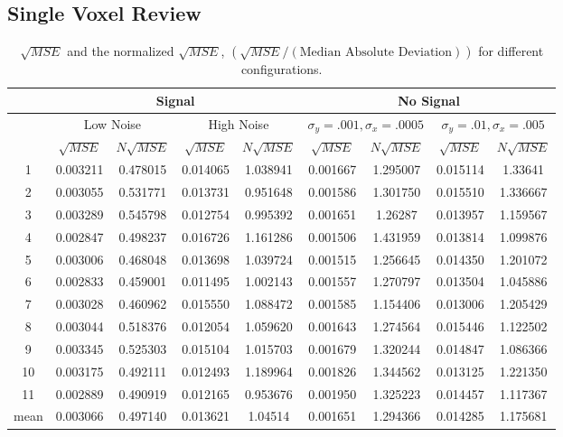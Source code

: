\subsection{Single Voxel Review}
\begin{table}[t]
\centering
\begin{tabular}{|c | c | c | c | c | c | c | c | c |}
\hline 
& \multicolumn{4}{|c|}{Signal} & \multicolumn{4}{|c|}{No Signal}\\
\hline
& \multicolumn{2}{|c|}{Low Noise} & \multicolumn{2}{|c|}{High Noise} 
& \multicolumn{2}{|c|}{$\sigma_y = .001, \sigma_x = .0005$} 
& \multicolumn{2}{|c|}{$\sigma_y = .01, \sigma_x = .005$}\\
\hline 
&$\sqrt{MSE}$ & $N\sqrt{MSE}$ &
 $\sqrt{MSE}$ & $N\sqrt{MSE}$ &
 $\sqrt{MSE}$ & $N\sqrt{MSE}$ &
 $\sqrt{MSE}$ & $N\sqrt{MSE}$ \\
\hline       
\hline       
1 & 0.003211 & 0.478015  & 0.014065  & 1.038941    &0.001667 & 1.295007 & 0.015114 & 1.33641 \\
2 & 0.003055 & 0.531771  & 0.013731  & 0.951648  &  0.001586 & 1.301750 & 0.015510 & 1.336667 \\
3 & 0.003289 & 0.545798  & 0.012754 &  0.995392  &  0.001651 & 1.26287 &  0.013957 & 1.159567 \\
4 & 0.002847 & 0.498237  & 0.016726  & 1.161286  &  0.001506 & 1.431959 & 0.013814 & 1.099876 \\
5 & 0.003006 & 0.468048  & 0.013698 &  1.039724   & 0.001515 & 1.256645 & 0.014350 & 1.201072 \\
6 & 0.002833 & 0.459001  & 0.011495 &  1.002143  &  0.001557 & 1.270797 & 0.013504 & 1.045886 \\
7 & 0.003028 & 0.460962  & 0.015550 &  1.088472   & 0.001585 & 1.154406 & 0.013006 & 1.205429 \\
8 & 0.003044 & 0.518376  & 0.012054 &  1.059620  &  0.001643 & 1.274564 & 0.015446 & 1.122502 \\
9 & 0.003345 & 0.525303  & 0.015104 &  1.015703  &  0.001679 & 1.320244 & 0.014847 & 1.086366 \\
10 & 0.003175 &0.492111  & 0.012493  & 1.189964  &  0.001826 & 1.344562 & 0.013125 & 1.221350 \\
11 & 0.002889 &0.490919  & 0.012165 &  0.953676  &  0.001950 & 1.325223 & 0.014457 & 1.117367 \\
\hline
mean & 0.003066 & 0.497140  & 0.013621 &  1.04514   &  0.001651 & 1.294366 & 0.014285 & 1.175681 \\
\hline
\end{tabular}
\caption{$\sqrt{MSE}$ and the normalized $\sqrt{MSE}$, $\left(\sqrt{MSE}/(\text{Median Absolute Deviation})\right)$  
for different configurations.} \label{tab:SignleVoxelActivationComparison} 
\end{table}

